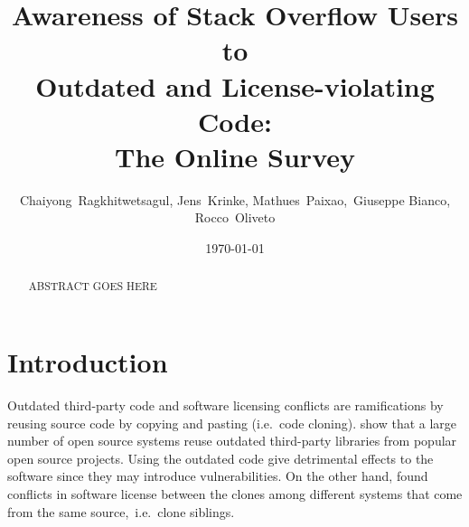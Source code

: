 \documentclass{svjour3}                     %
\begin{document}
\title{Awareness of Stack Overflow Users to\\ Outdated and License-violating Code:\\ The Online Survey}


\author{Chaiyong~Ragkhitwetsagul, Jens~Krinke, Mathues~Paixao,~Giuseppe Bianco, Rocco~Oliveto}


\institute{Chaiyong Ragkhitwetsagul~(\Letter), Jens Krinke \at
              Computer Science Department., University College London, UK \\
              Tel.: +44 (0)20 7679,  Fax: +44 (0)20 7387 1397\\
              \email{\{ucabagk, j.krinke\}@ucl.ac.uk}           %
}

\date{\today}


\maketitle

\begin{abstract}
ABSTRACT GOES HERE
\end{abstract}

\section{Introduction}

Outdated third-party code and software licensing conflicts are ramifications by
reusing source code by copying and pasting (i.e.~code cloning). \cite{Xia2014}
show that a large number of open source systems reuse outdated third-party
libraries from popular open source projects. Using the outdated code give
detrimental effects to the software since they may introduce vulnerabilities. On
the other hand, \cite{German2009} found conflicts in software license between
the clones among different systems that come from the same source,~i.e.~clone
siblings.
\end{document}
